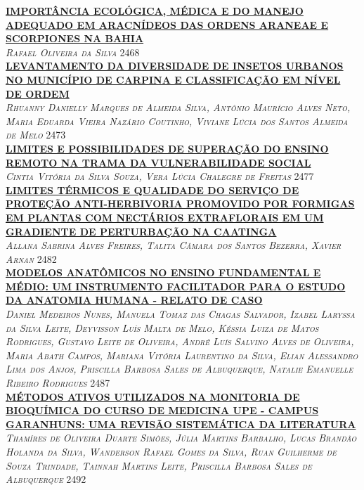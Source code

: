 \noindent \textsc{\hyperlink{trabalhos/245604.pdf.1}{\textbf{IMPORTÂNCIA ECOLÓGICA, MÉDICA E DO MANEJO ADEQUADO EM ARACNÍDEOS DAS ORDENS ARANEAE E SCORPIONES NA BAHIA}}}\\ 
\noindent \textsc{\textit{Rafael Oliveira da Silva}} \hfill 2468\\ 

\noindent \textsc{\hyperlink{trabalhos/250156.pdf.1}{\textbf{LEVANTAMENTO DA DIVERSIDADE DE INSETOS URBANOS NO MUNICÍPIO DE CARPINA E CLASSIFICAÇÃO EM NÍVEL DE ORDEM}}}\\ 
\noindent \textsc{\textit{Rhuanny Danielly Marques de Almeida Silva, Antônio Maurício Alves Neto, Maria Eduarda Vieira Nazário Coutinho, Viviane Lúcia dos Santos Almeida de Melo}} \hfill 2473\\ 

\noindent \textsc{\hyperlink{trabalhos/247482.pdf.1}{\textbf{LIMITES E POSSIBILIDADES DE SUPERAÇÃO DO ENSINO REMOTO NA TRAMA DA VULNERABILIDADE SOCIAL}}}\\ 
\noindent \textsc{\textit{Cintia Vitória da Silva Souza, Vera Lúcia Chalegre  de Freitas}} \hfill 2477\\ 

\noindent \textsc{\hyperlink{trabalhos/250217.pdf.1}{\textbf{LIMITES TÉRMICOS E QUALIDADE DO SERVIÇO DE PROTEÇÃO ANTI-HERBIVORIA PROMOVIDO POR FORMIGAS EM PLANTAS COM NECTÁRIOS EXTRAFLORAIS EM UM GRADIENTE DE PERTURBAÇÃO NA CAATINGA}}}\\ 
\noindent \textsc{\textit{Allana Sabrina Alves Freires, Talita Câmara dos Santos Bezerra, Xavier Arnan}} \hfill 2482\\ 

\noindent \textsc{\hyperlink{trabalhos/251825.pdf.1}{\textbf{MODELOS ANATÔMICOS NO ENSINO FUNDAMENTAL E MÉDIO: UM INSTRUMENTO FACILITADOR PARA O ESTUDO DA ANATOMIA HUMANA - RELATO DE CASO}}}\\ 
\noindent \textsc{\textit{Daniel Medeiros Nunes, Manuela Tomaz das Chagas Salvador, Izabel Laryssa da Silva Leite, Deyvisson Luís Malta de Melo, Késsia Luiza de Matos Rodrigues, Gustavo Leite de Oliveira, André Luís Salvino Alves de Oliveira, Maria Abath Campos, Mariana Vitória Laurentino da Silva, Elian Alessandro Lima dos Anjos, Priscilla Barbosa Sales de Albuquerque, Natalie Emanuelle Ribeiro Rodrigues}} \hfill 2487\\ 

\noindent \textsc{\hyperlink{trabalhos/250361.pdf.1}{\textbf{MÉTODOS ATIVOS UTILIZADOS NA MONITORIA DE BIOQUÍMICA DO CURSO DE MEDICINA UPE - CAMPUS GARANHUNS: UMA REVISÃO SISTEMÁTICA DA LITERATURA}}}\\ 
\noindent \textsc{\textit{Thamíres de Oliveira Duarte Simões, Júlia Martins Barbalho, Lucas Brandão Holanda da Silva, Wanderson Rafael Gomes da Silva, Ruan Guilherme de Souza Trindade, Tainnah Martins Leite, Priscilla Barbosa Sales de Albuquerque}} \hfill 2492\\ 

